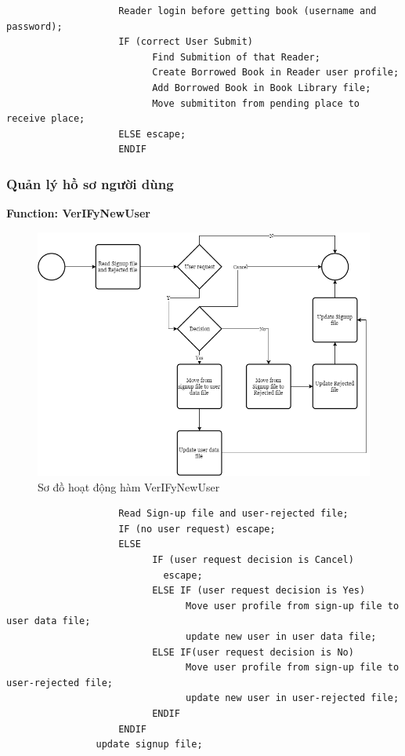 \documentclass[12pt,a4paper]{report}
\begin{document}
                \begin{verbatim}
                    Reader login before getting book (username and password);
                    IF (correct User Submit)
                          Find Submition of that Reader;
                          Create Borrowed Book in Reader user profile;
                          Add Borrowed Book in Book Library file;
                          Move submititon from pending place to receive place;
                    ELSE escape;
                    ENDIF
                \end{verbatim}
            \newpage
            \subsubsection{Quản lý hồ sơ người dùng}
                \textbf{Function: VerIFyNewUser}
                \begin{figure}[H]
                    \centering
                    \label{F:adduser}
                    \includegraphics[scale = .4]{adduser.png}
                    \caption{Sơ đồ hoạt động hàm VerIFyNewUser}
                \end{figure}
                \begin{verbatim}
                    Read Sign-up file and user-rejected file;
                    IF (no user request) escape;
                    ELSE
                          IF (user request decision is Cancel)
                            escape;
                          ELSE IF (user request decision is Yes)
                                Move user profile from sign-up file to user data file;
                                update new user in user data file;
                          ELSE IF(user request decision is No)
                                Move user profile from sign-up file to user-rejected file;
                                update new user in user-rejected file;
                          ENDIF
                    ENDIF
                update signup file;
                \end{verbatim}
\end{document}
